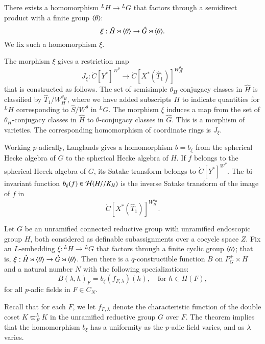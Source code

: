 There exists a homomorphism ${}^LH\to {}^LG$ that factors through a
semidirect product with a finite group $\langle{\theta}\rangle$:
\[
\xi:\hat H \rtimes \langle{\theta}\rangle \to \hat G \rtimes \langle{\theta}\rangle.
\]
We fix such a homomorphism $\xi$.  

The morphism $\xi$ gives a restriction map
\begin{equation}
J_\xi:\ring{C}[Y^*]^{W^\theta} \to \ring{C}[X^*(\hat T_1)]^{W_H^{\theta_H}}
\end{equation}
that is constructed as follows.  The set of semisimple $\theta_H$
conjugacy classes in $\hat H$ is classified by $\hat
T_1/W_H^{\theta_H}$, where we have added subscripts $H$ to indicate
quantities for ${}^LH$ corresponding to $\hat S/W^\theta$ in ${}^LG$.
The morphism $\xi$ induces a map from the set of $\theta_H$-conjugacy
classes in $\hat H$ to $\theta$-conjugacy classes in $\hat G$.  This
is a morphism of varieties. The corresponding homomorphism of
coordinate rings is $J_\xi$.

Working $p$-adically, Langlands gives a homomorphism
$b = b_\xi$ from the spherical Hecke algebra of $G$ to the spherical
Hecke algebra of $H$.  If $f$ belongs to the spherical Hecek algebra
of $G$, its Satake transform belongs to $\ring{C}[Y^*]^{W^\theta}$.
The bi-invariant function $b_\xi(f)\in\mathcal H(H//K_H)$ is the inverse
Satake transform of the image of $f$ in
\[
\ring{C}[X^*(\hat T_1)]^{W_H^{\theta_H}}.
\]



\begin{theorem}\label{thm:B}
  Let $G$ be an unramified connected reductive group with unramified
  endoscopic group $H$, both considered as definable subassignments
  over a cocycle space $Z$.  Fix an $L$-embedding $\xi:{}^LH\to {}^LG$
  that factors through a finite cyclic group $\langle{\theta}\rangle$; that is,
  $\xi:\hat H\rtimes \langle{\theta}\rangle \to \hat G \rtimes \langle{\theta}\rangle$.
  Then there is a $q$-constructible function $B$ on $P^+_G\times H$
  and a natural number $N$ with the following specializations:
\[
B(\lambda,h)_F = b_\xi(f_{F,\lambda})(h),\quad \text{for } h\in H(F),
\]
for all $p$-adic fields in $F\in C_N$.  
\end{theorem}

Recall that for each $F$, we let $f_{F,\lambda}$ denote the
characteristic function of the double coset $K\varpi_F^\lambda K$ in
the unramified reductive group $G$ over $F$.  The theorem implies that
the homomorphism $b_\xi$ has a uniformity as the $p$-adic field
varies, and as $\lambda$ varies.

